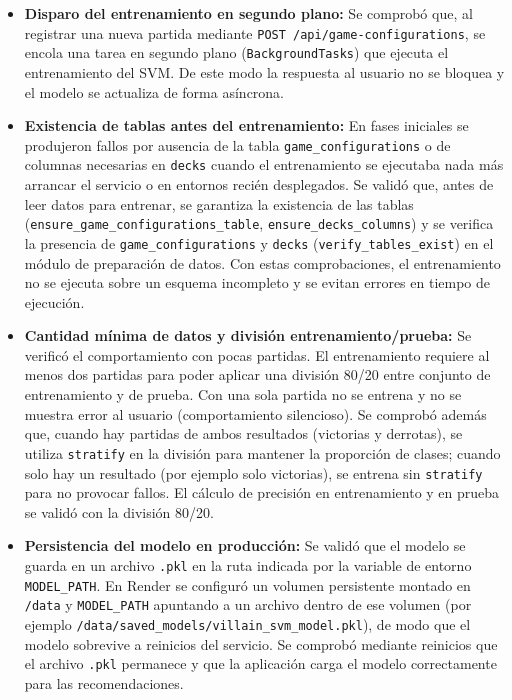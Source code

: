 \begin{itemize}
    \item \textbf{Disparo del entrenamiento en segundo plano:} Se comprobó que, al registrar una nueva partida mediante \texttt{POST /api/game-configurations}, se encola una tarea en segundo plano (\texttt{BackgroundTasks}) que ejecuta el entrenamiento del SVM. De este modo la respuesta al usuario no se bloquea y el modelo se actualiza de forma asíncrona.

    \item \textbf{Existencia de tablas antes del entrenamiento:} En fases iniciales se produjeron fallos por ausencia de la tabla \texttt{game\_configurations} o de columnas necesarias en \texttt{decks} cuando el entrenamiento se ejecutaba nada más arrancar el servicio o en entornos recién desplegados. Se validó que, antes de leer datos para entrenar, se garantiza la existencia de las tablas (\texttt{ensure\_game\_configurations\_table}, \texttt{ensure\_decks\_columns}) y se verifica la presencia de \texttt{game\_configurations} y \texttt{decks} (\texttt{verify\_tables\_exist}) en el módulo de preparación de datos. Con estas comprobaciones, el entrenamiento no se ejecuta sobre un esquema incompleto y se evitan errores en tiempo de ejecución.

    \item \textbf{Cantidad mínima de datos y división entrenamiento/prueba:} Se verificó el comportamiento con pocas partidas. El entrenamiento requiere al menos dos partidas para poder aplicar una división 80/20 entre conjunto de entrenamiento y de prueba. Con una sola partida no se entrena y no se muestra error al usuario (comportamiento silencioso). Se comprobó además que, cuando hay partidas de ambos resultados (victorias y derrotas), se utiliza \texttt{stratify} en la división para mantener la proporción de clases; cuando solo hay un resultado (por ejemplo solo victorias), se entrena sin \texttt{stratify} para no provocar fallos. El cálculo de precisión en entrenamiento y en prueba se validó con la división 80/20.

    \item \textbf{Persistencia del modelo en producción:} Se validó que el modelo se guarda en un archivo \texttt{.pkl} en la ruta indicada por la variable de entorno \texttt{MODEL\_PATH}. En Render se configuró un volumen persistente montado en \texttt{/data} y \texttt{MODEL\_PATH} apuntando a un archivo dentro de ese volumen (por ejemplo \texttt{/data/saved\_models/villain\_svm\_model.pkl}), de modo que el modelo sobrevive a reinicios del servicio. Se comprobó mediante reinicios que el archivo \texttt{.pkl} permanece y que la aplicación carga el modelo correctamente para las recomendaciones.


\end{itemize}
